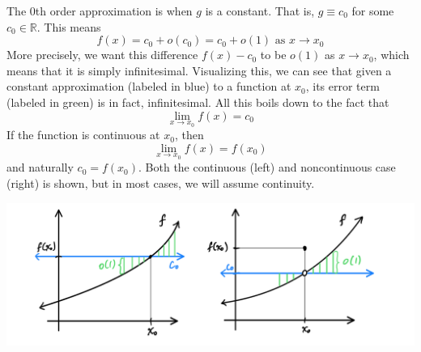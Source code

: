   \begin{example}
    The 0th order approximation is when $g$ is a constant. That is, $g \equiv c_0$ for some $c_0 \in \mathbb{R}$. This means
    \begin{equation}
      f(x) = c_0 + o(c_0) = c_0 + o(1) \text{ as } x \rightarrow x_0
    \end{equation}
    More precisely, we want this difference $f(x) - c_0$ to be $o(1)$ as $x \rightarrow x_0$, which means that it is simply infinitesimal. Visualizing this, we can see that given a constant approximation (labeled in blue) to a function at $x_0$, its error term (labeled in green) is in fact, infinitesimal. All this boils down to the fact that 
    \[\lim_{x \rightarrow x_0} f(x) = c_0\]
    If the function is continuous at $x_0$, then 
    \[\lim_{x \rightarrow x_0} f(x) = f(x_0)\]
    and naturally $c_0 = f(x_0)$. Both the continuous (left) and noncontinuous case (right) is shown, but in most cases, we will assume continuity. 
    \begin{center}
      \includegraphics[scale=0.25]{img/Constant_Approximation_Continuous_Noncontinuous_case.PNG}
    \end{center}
  \end{example}

